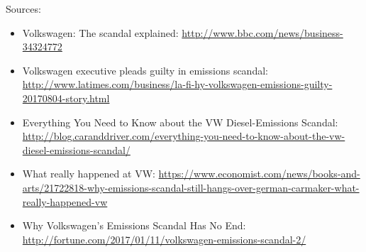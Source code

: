 \documentclass[12pt]{article}
\begin{document}
Sources:
\begin{itemize}
	\item Volkswagen: The scandal explained: \url{http://www.bbc.com/news/business-34324772}
	\item Volkswagen executive pleads guilty in emissions scandal: \url{http://www.latimes.com/business/la-fi-hy-volkswagen-emissions-guilty-20170804-story.html}
	\item Everything You Need to Know about the VW Diesel-Emissions Scandal: \url{http://blog.caranddriver.com/everything-you-need-to-know-about-the-vw-diesel-emissions-scandal/}
	\item What really happened at VW: \url{https://www.economist.com/news/books-and-arts/21722818-why-emissions-scandal-still-hangs-over-german-carmaker-what-really-happened-vw}
	\item Why Volkswagen’s Emissions Scandal Has No End: \url{http://fortune.com/2017/01/11/volkswagen-emissions-scandal-2/}
\end{itemize}
 
 
 
 
\end{document}
